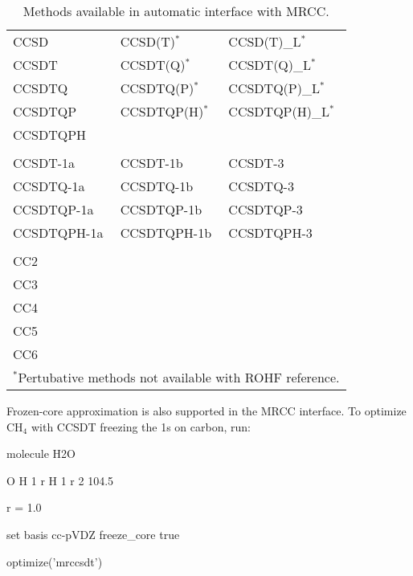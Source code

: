 \begin{table}
\caption{Methods available in automatic interface with MRCC.}
\label{table:mrccauto}
\begin{center}
\small
\begin{tabular}{lll} \hline\hline
CCSD        & CCSD(T)$^*$      & CCSD(T)\_L$^*$    \\
CCSDT       & CCSDT(Q)$^*$     & CCSDT(Q)\_L$^*$   \\
CCSDTQ      & CCSDTQ(P)$^*$    & CCSDTQ(P)\_L$^*$  \\
CCSDTQP     & CCSDTQP(H)$^*$   & CCSDTQP(H)\_L$^*$ \\
CCSDTQPH    &                  &                   \\
            &                  &                   \\
CCSDT-1a    & CCSDT-1b         & CCSDT-3           \\
CCSDTQ-1a   & CCSDTQ-1b        & CCSDTQ-3          \\
CCSDTQP-1a  & CCSDTQP-1b       & CCSDTQP-3         \\
CCSDTQPH-1a & CCSDTQPH-1b      & CCSDTQPH-3        \\
            &                  &                   \\
CC2         &                  &                   \\
CC3         &                  &                   \\
CC4         &                  &                   \\
CC5         &                  &                   \\
CC6         &                  &                   \\
\hline\hline
\multicolumn{3}{l}{
\footnotesize{$^*$Pertubative methods not available with ROHF reference.}
}
\end{tabular}
\end{center}
\end{table}

Frozen-core approximation is also supported in the MRCC interface.
To optimize CH$_4$ with CCSDT freezing the 1s on carbon, run:

\begin{Snippet}
molecule H2O {
    O
    H 1 r
    H 1 r 2 104.5

    r = 1.0
}

set {
    basis cc-pVDZ
    freeze_core true
}

optimize('mrccsdt')
\end{Snippet}
